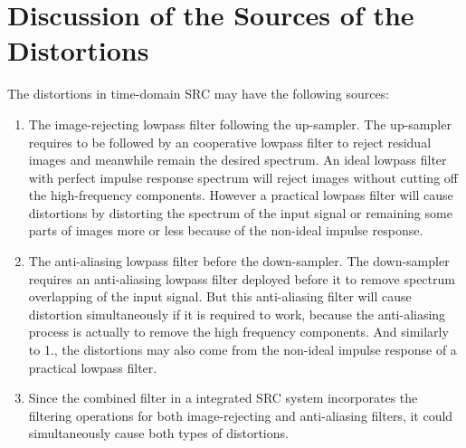 \documentclass[letterpaper,12pt]{article}
\begin{document}
\section{Discussion of the Sources of the Distortions}

The distortions in time-domain SRC may have the following sources:
\begin{enumerate}
\item The image-rejecting lowpass filter following the up-sampler. The up-sampler requires to be followed by an cooperative lowpass filter to reject residual images and meanwhile remain the desired spectrum. An ideal lowpass filter with perfect impulse response spectrum will reject images without cutting off the high-frequency components. However a practical lowpass filter will cause distortions by distorting the spectrum of the input signal or remaining some parts of images more or less because of the non-ideal impulse response. 
\item The anti-aliasing lowpass filter before the down-sampler. The down-sampler requires an anti-aliasing lowpass filter deployed before it to remove spectrum overlapping of the input signal. But this anti-aliasing filter will cause distortion simultaneously if it is required to work, because the anti-aliasing process is actually to remove the high frequency components. And similarly to 1., the distortions may also come from the non-ideal impulse response of a practical lowpass filter.
\item Since the combined filter in a integrated SRC system incorporates the filtering operations for both image-rejecting and anti-aliasing filters, it could simultaneously cause both types of distortions.
\end{enumerate}
\end{document}
